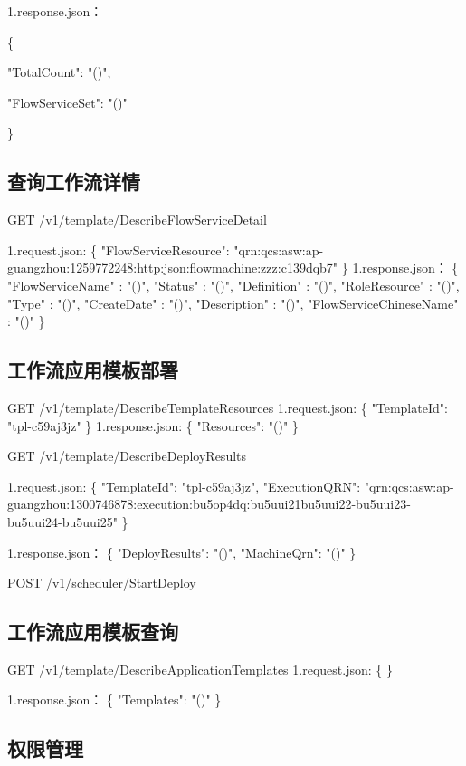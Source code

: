 1.response.json：

\{

"TotalCount": "\@exists()",

"FlowServiceSet": "\@exists()"

\}

\subsection{查询工作流详情}
GET /v1/template/DescribeFlowServiceDetail


1.request.json:
\{
"FlowServiceResource": "qrn:qcs:asw:ap-guangzhou:1259772248:http:json:flowmachine:zzz:c139dqb7"
\}
1.response.json：
\{
"FlowServiceName"        :  "\@notEmpty()",
"Status"                 :  "\@notEmpty()",
"Definition"             :  "\@notEmpty()",
"RoleResource"           :  "\@notEmpty()",
"Type"                   :  "\@notEmpty()",
"CreateDate"             :  "\@notEmpty()",
"Description"            :  "\@notEmpty()",
"FlowServiceChineseName" :  "\@exists()"
\}

\subsection{工作流应用模板部署}
GET /v1/template/DescribeTemplateResources
1.request.json:
\{
"TemplateId": "tpl-c59aj3jz"
\}
1.response.json:
\{
"Resources": "\@exists()"
\}

GET /v1/template/DescribeDeployResults

1.request.json:
\{
"TemplateId": "tpl-c59aj3jz",
"ExecutionQRN": "qrn:qcs:asw:ap-guangzhou:1300746878:execution:bu5op4dq:bu5uui21bu5uui22-bu5uui23-bu5uui24-bu5uui25"
\}

1.response.json：
\{
"DeployResults": "\@exists()",
"MachineQrn": "\@len()"
\}

POST /v1/scheduler/StartDeploy

\subsection{工作流应用模板查询}

GET /v1/template/DescribeApplicationTemplates
1.request.json:
\{
\}

1.response.json：
\{
"Templates": "\@exists()"
\}

\subsection{权限管理}

